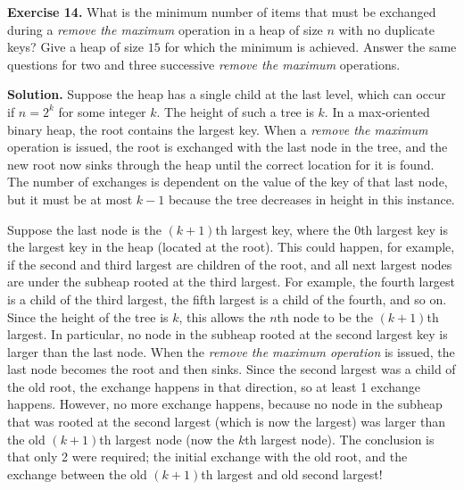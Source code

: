 \documentclass[12pt, a4paper]{article}
\newenvironment{ex}[2][Exercise]
{\par\medskip\noindent \textbf{#1 #2.}}
{\medskip}
\newenvironment{sol}[1][Solution]
{\par\medskip\noindent \textbf{#1.} }
{\medskip}
\begin{document}
	\begin{ex}{14}
		What is the minimum number of items that must be exchanged during a
		\emph{remove the maximum} operation in a heap of size $n$ with no duplicate keys?
		Give a heap of size $15$ for which the minimum is achieved. Answer the same
		questions for two and three successive \emph{remove the maximum} operations.
	\end{ex}
	\begin{sol}
		Suppose the heap has a single child at the last level, which can occur
		if $n=2^k$ for some integer $k$. The height of such a tree is $k$. In
		a max-oriented binary heap, the root contains the largest key. When
		a \emph{remove the maximum} operation is issued, the root is exchanged
		with the last node in the tree, and the new root now sinks through the
		heap until the correct location for it is found. The number of exchanges
		is dependent on the value of the key of that last node, but it must
		be at most $k-1$ because the tree decreases in height in this instance.
		
		Suppose the last node is the $(k+1)$th largest key, where the $0$th largest
		key is the largest key in the heap (located at the root). This could happen,
		for example, if the second and third largest are children of the root, and
		all next largest  nodes are under the subheap rooted at the third largest.
		For example, the fourth largest is a child of the third largest, the fifth
		largest is a child of the fourth, and so on. Since the height of the
		tree is $k$, this allows the $n$th node to be the $(k+1)$th largest.
		In particular, no node in the subheap rooted at the second largest key
		is larger than the last node. When the \emph{remove the maximum operation}
		is issued, the last node becomes the root and then sinks.  Since the second
		largest was a child of the old root, the exchange happens in that direction,
		so at least 1 exchange happens. However, no more exchange happens, because
		no node in the subheap that was rooted at the second largest (which is now
		the largest) was larger than the old $(k+1)$th largest node (now the $k$th
		largest node). The conclusion is that only 2 were required; the initial exchange
		with the old root, and the exchange between the old $(k+1)$th largest
		and old second largest!
		

\end{sol}
\end{document}
